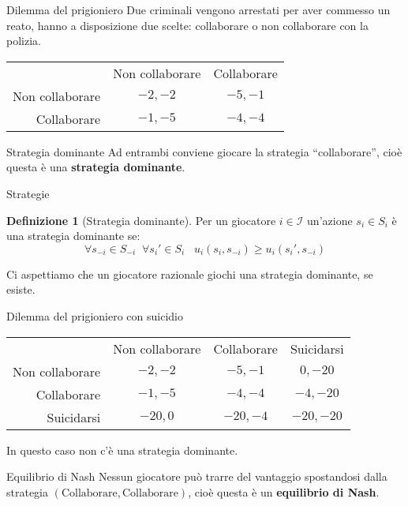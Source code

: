 \documentclass{beamer}
\newcounter{counter1}
\theoremstyle{plain}
\theoremstyle{definition}
\newtheorem{mydef}[counter1]{Definizione}
\theoremstyle{remark}
\newcommand{\pa}[1]{\left(#1\right)}
\begin{document}
\begin{frame}{Dilemma del prigioniero}
  Due criminali vengono arrestati per aver commesso un reato, hanno a
  disposizione due scelte: collaborare o non collaborare con la
  polizia.

  \begin{tabular}{rcc}
    & Non collaborare & Collaborare \\
    \cline{2-3}
    Non collaborare & \multicolumn{1}{|c|}{$-2,-2$} & \multicolumn{1}{|c|}{$-5,-1$}  \\
    \cline{2-3}
    Collaborare & \multicolumn{1}{|c|}{$-1,-5$} & \multicolumn{1}{|c|}{$-4,-4$}  \\
    \cline{2-3}
  \end{tabular}
  \pause \vfill

  \begin{block}{Strategia dominante}
    Ad entrambi conviene giocare la strategia ``collaborare'', cioè
    questa è una \textbf{strategia dominante}.
  \end{block}
\end{frame}

\begin{frame}{Strategie}
  \begin{mydef}[Strategia dominante]
    Per un giocatore $i\in\mathcal{I}$ un'azione $s_i\in S_i$ è una
    strategia dominante se:
    \[ \forall s_{-i} \in S_{-i}\;\; \forall s_i' \in S_i\;\;\;
      u_i\pa{s_i,s_{-i}} \ge u_i\pa{s_i',s_{-i}} \]
  \end{mydef}

  Ci aspettiamo che un giocatore razionale giochi una strategia
  dominante, se esiste.
\end{frame}

\begin{frame}{Dilemma del prigioniero con suicidio}
    \begin{tabular}{rccc}
    & Non collaborare & Collaborare & Suicidarsi \\
    \cline{2-4}
    Non collaborare & \multicolumn{1}{|c|}{$-2,-2$} & \multicolumn{1}{|c|}{$-5,-1$} & \multicolumn{1}{|c|}{$0,-20$}  \\
    \cline{2-4}
    Collaborare & \multicolumn{1}{|c|}{$-1,-5$} & \multicolumn{1}{|c|}{$-4,-4$}  & \multicolumn{1}{|c|}{$-4,-20$} \\
    \cline{2-4}
    Suicidarsi & \multicolumn{1}{|c|}{$-20,0$} & \multicolumn{1}{|c|}{$-20,-4$}  & \multicolumn{1}{|c|}{$-20,-20$} \\
    \cline{2-4}
  \end{tabular}
  
  In questo caso non c'è una strategia dominante.
  \pause \vfill

  \begin{block}{Equilibrio di Nash}
    Nessun giocatore può trarre del vantaggio spostandosi dalla
    strategia $\pa{\text{Collaborare},\text{Collaborare}}$, cioè
    questa è un \textbf{equilibrio di Nash}.
  \end{block}
\end{frame}
\end{document}
